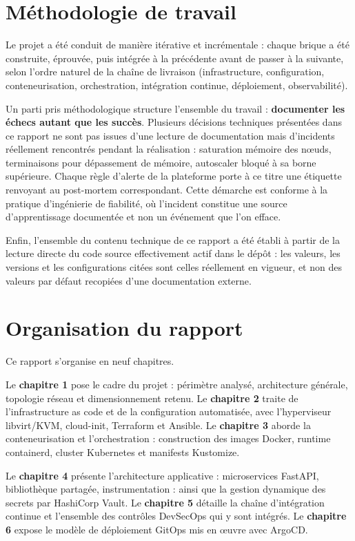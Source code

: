 \documentclass[12pt,a4paper,twoside,openright]{report}
\begin{document}
\section*{Méthodologie de travail}

Le projet a été conduit de manière itérative et incrémentale : chaque brique a été
construite, éprouvée, puis intégrée à la précédente avant de passer à la suivante,
selon l'ordre naturel de la chaîne de livraison (infrastructure, configuration,
conteneurisation, orchestration, intégration continue, déploiement, observabilité).

Un parti pris méthodologique structure l'ensemble du travail : \textbf{documenter les
échecs autant que les succès}. Plusieurs décisions techniques présentées dans ce
rapport ne sont pas issues d'une lecture de documentation mais d'incidents réellement
rencontrés pendant la réalisation : saturation mémoire des n\oe uds, terminaisons
pour dépassement de mémoire, autoscaler bloqué à sa borne supérieure. Chaque règle
d'alerte de la plateforme porte à ce titre une étiquette renvoyant au post-mortem
correspondant. Cette démarche est conforme à la pratique d'ingénierie de fiabilité,
où l'incident constitue une source d'apprentissage documentée et non un événement
que l'on efface.

Enfin, l'ensemble du contenu technique de ce rapport a été établi à partir de la
lecture directe du code source effectivement actif dans le dépôt : les valeurs, les
versions et les configurations citées sont celles réellement en vigueur, et non des
valeurs par défaut recopiées d'une documentation externe.

\section*{Organisation du rapport}

Ce rapport s'organise en neuf chapitres.

Le \textbf{chapitre 1} pose le cadre du projet : périmètre analysé, architecture
générale, topologie réseau et dimensionnement retenu. Le \textbf{chapitre 2} traite de
l'infrastructure as code et de la configuration automatisée, avec l'hyperviseur
libvirt/KVM, cloud-init, Terraform et Ansible. Le \textbf{chapitre 3} aborde la
conteneurisation et l'orchestration : construction des images Docker, runtime
containerd, cluster Kubernetes et manifests Kustomize.

Le \textbf{chapitre 4} présente l'architecture applicative : microservices FastAPI,
bibliothèque partagée, instrumentation : ainsi que la gestion dynamique des secrets
par HashiCorp Vault. Le \textbf{chapitre 5} détaille la chaîne d'intégration continue
et l'ensemble des contrôles DevSecOps qui y sont intégrés. Le \textbf{chapitre 6}
expose le modèle de déploiement GitOps mis en \oe uvre avec ArgoCD.
\end{document}

